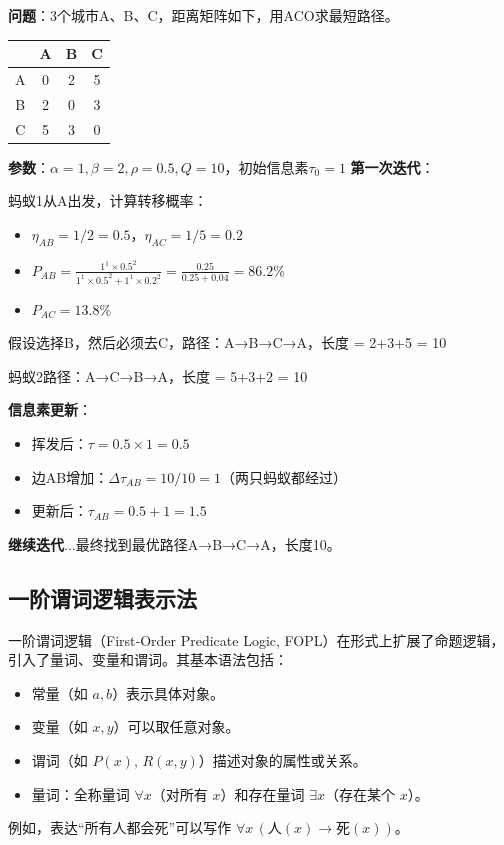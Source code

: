 \begin{examplebox}[例题4.5 蚁群算法解决TSP问题]
\textbf{问题}：3个城市A、B、C，距离矩阵如下，用ACO求最短路径。
\begin{center}
\begin{tabular}{c|ccc}
 & A & B & C \\
\hline
A & 0 & 2 & 5 \\
B & 2 & 0 & 3 \\
C & 5 & 3 & 0 \\
\end{tabular}
\end{center}

\textbf{参数}：$\alpha=1, \beta=2, \rho=0.5, Q=10$，初始信息素$\tau_0=1$
\tcblower
\textbf{第一次迭代}：

蚂蚁1从A出发，计算转移概率：
\begin{itemize}[itemsep=0pt]
    \item $\eta_{AB} = 1/2 = 0.5$，$\eta_{AC} = 1/5 = 0.2$
    \item $P_{AB} = \frac{1^1 \times 0.5^2}{1^1 \times 0.5^2 + 1^1 \times 0.2^2} = \frac{0.25}{0.25+0.04} = 86.2\%$
    \item $P_{AC} = 13.8\%$
\end{itemize}

假设选择B，然后必须去C，路径：A→B→C→A，长度 = 2+3+5 = 10

蚂蚁2路径：A→C→B→A，长度 = 5+3+2 = 10

\textbf{信息素更新}：
\begin{itemize}[itemsep=0pt]
    \item 挥发后：$\tau = 0.5 \times 1 = 0.5$
    \item 边AB增加：$\Delta\tau_{AB} = 10/10 = 1$（两只蚂蚁都经过）
    \item 更新后：$\tau_{AB} = 0.5 + 1 = 1.5$
\end{itemize}

\textbf{继续迭代}...最终找到最优路径A→B→C→A，长度10。
\end{examplebox}



\subsection{一阶谓词逻辑表示法}
一阶谓词逻辑（First‑Order Predicate Logic, FOPL）在形式上扩展了命题逻辑，引入了量词、变量和谓词。其基本语法包括：
\begin{itemize}[leftmargin=2em,itemsep=0pt]
  \item 常量（如 $a, b$）表示具体对象。
  \item 变量（如 $x, y$）可以取任意对象。
  \item 谓词（如 $P(x)$, $R(x,y)$）描述对象的属性或关系。
  \item 量词：全称量词 $\forall x$（对所有 $x$）和存在量词 $\exists x$（存在某个 $x$）。
\end{itemize}
例如，表达“所有人都会死”可以写作 $\forall x\, (\text{人}(x) \rightarrow \text{死}(x))$。

